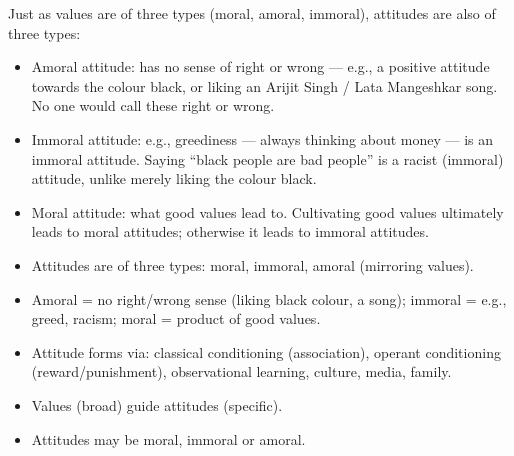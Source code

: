 Just as values are of three types (moral, amoral, immoral), attitudes are also of three types:

\begin{itemize}
\item Amoral attitude: has no sense of right or wrong --- e.g., a positive attitude towards the colour black, or liking an Arijit Singh / Lata Mangeshkar song. No one would call these right or wrong.
\item Immoral attitude: e.g., greediness --- always thinking about money --- is an immoral attitude. Saying ``black people are bad people'' is a racist (immoral) attitude, unlike merely liking the colour black.
\item Moral attitude: what good values lead to. Cultivating good values ultimately leads to moral attitudes; otherwise it leads to immoral attitudes.
\end{itemize}

\begin{KeyConcept}
\begin{itemize}
\item Attitudes are of three types: moral, immoral, amoral (mirroring values).
\item Amoral = no right/wrong sense (liking black colour, a song); immoral = e.g., greed, racism; moral = product of good values.
\end{itemize}
\end{KeyConcept}

\begin{QuickRevision}
\begin{itemize}
\item Attitude forms via: classical conditioning (association), operant conditioning (reward/punishment), observational learning, culture, media, family.
\item Values (broad) guide attitudes (specific).
\item Attitudes may be moral, immoral or amoral.
\end{itemize}
\end{QuickRevision}
